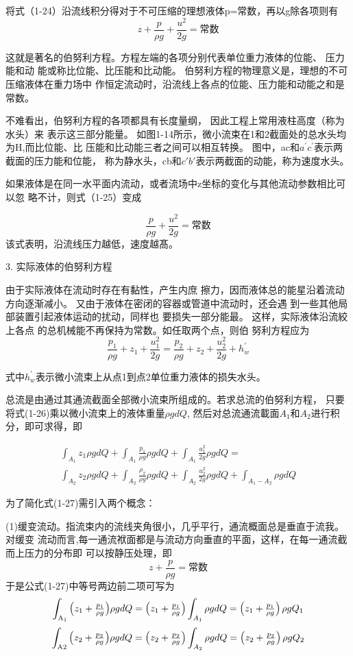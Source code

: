 将式（1-24）沿流线积分得对于不可压缩的理想液体p=常数，再以g除各项则有
$$z + \frac{p}{{\rho g}} + \frac{{{u^2}}}{{2g}} =\text{常数} $$ 

这就是著名的伯努利方程。方程左端的各项分别代表单位重力液体的位能、
压力能和动 能或称比位能、比压能和比动能。
伯努利方程的物理意义是，理想的不可压缩液体在重力场中 
作恒定流动时，沿流线上各点的位能、压力能和动能之和是常数。


不难看出，伯努利方程的各项都具有长度量纲，
因此工程上常用液柱高度（称为水头）来 表示这三部分能量。
如图1-14所示，微小流束在1和2截面处的总水头均为H,而比位能、比
压能和比动能三者之间可以相互转换。
图中，ac和$a^{'}c^{'}$表示两截面的压力能和位能，
称为静水头，cb和$c{'}b{'}$表示两截面的动能，称为速度水头。

如果液体是在同一水平面内流动，或者流场中z坐标的变化与其他流动参数相比可以忽 略不计，则式（1-25）变成 

$$\frac{p}{{\rho g}} + \frac{{{u^2}}}{{2g}} =\text{常数} $$ 
该式表明，沿流线压力越低，速度越髙。

3.	实际液体的伯努利方程

由于实际液体在流动时存在有黏性，产生内庶 擦力，因而液体总的能星沿着流动方向逐渐减小。 
又由于液体在密闭的容器或管道中流动时，还会遇 到一些其他局部装置引起液体运动的扰动，同样也 要损失一部分能最。
这样，实际液体沿流絞上各点 的总机械能不再保持为常数。如任取两个点，则伯 努利方程应为
$$\frac{p_1}{\rho g}+z_1+\frac{u^2 _1}{2g}=\frac{p_2}{\rho g}+z_2+\frac{u^2_2}{2g}+h^{'} _w$$

式中$h^{'} _w$表示微小流束上从点1到点2单位重力液体的损失水头。

总流是由通过其通流截面全部微小流束所组成的。若求总流的伯努利方程，
只要将式(1-26)乘以微小流束上的液体重量$\rho gdQ$,
然后对总流通流載面$A_1$和$A_2$进行积分，即可求得，即

  
 \begin{equation}
  \begin{aligned}
 \int_{A_1}^{}z_{1}\rho gdQ+\int_{A_1}^{}\frac{p_1}{\rho g}\rho gdQ+  \int_{A_1}^{}\frac{u^2 _1}{2g}\rho gdQ
  = \\ \int_{A_2}^{}z_{2}\rho gdQ
  + \int_{A_2}^{}\frac{\rho _2}{\rho g}\rho gdQ
  +  \int_{A_2}^{}\frac{u^2 _2}{2g}\rho gdQ
  +\int_{A_1-A_2}^{}\rho gdQ 
  \end{aligned}
 \end{equation}
 

为了简化式(1-27)需引入两个概念：

(1)缓变流动。指流束内的流线夹角很小，几乎平行，通流概面总是垂直于流我。对缓变 流动而言,每一通流袱面都是与流动方向垂直的平面，这样，在每一通流截而上压力的分布即
可以按静压处理，即
$$z+\frac{p}{\rho g}=\text{常数}$$
于是公式(1-27)中等号两边前二项可写为
\[\int_{{{\rm{A}}_1}} {\left( {{z_1} + {\textstyle{{{p_1}} \over {\rho g}}}} \right)} \rho gdQ = \left( {{z_1} + {\textstyle{{{p_1}} \over {\rho g}}}} \right)\int_{{A_1}} {\rho gdQ}  = \left( {{z_1} + {\textstyle{{{p_1}} \over {\rho g}}}} \right)\rho g{Q_1}\]
\[\int_{{\rm{A}}2} {\left( {{z_2} + {\textstyle{{{p_2}} \over {\rho g}}}} \right)} \rho gdQ = \left( {{z_2} + {\textstyle{{{p_2}} \over {\rho g}}}} \right)\int_{{A_2}} {\rho gdQ}  = \left( {{z_2} + {\textstyle{{{p_2}} \over {\rho g}}}} \right)\rho g{Q_2}\]

